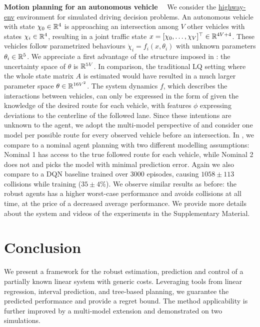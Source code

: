 \documentclass{article}
\begin{document}
\textbf{Motion planning for an autonomous vehicle}~~
We consider the \href{https://github.com/eleurent/highway-env}{highway-env} environment \citep{highway-env} for simulated driving decision problems. An autonomous vehicle with state $\chi_0\in\mathbb{R}^4$ is approaching an intersection among $V$ other vehicles with states $\chi_i\in\mathbb{R}^4$, resulting in a joint traffic state $x = [\chi_0, \dots,\chi_V]^\top\in\mathbb{R}^{4V+4}$. These vehicles follow parametrized behaviours $\dot{\chi}_i=f_i(x,\theta_i)$ with unknown parameters $\theta_i\in\mathbb{R}^5$. We appreciate a first advantage of the structure imposed in : the uncertainty space of $\theta$ is $\mathbb{R}^{5V}$. In comparison, the traditional LQ setting where the whole state matrix $A$ is estimated would have resulted in a much larger parameter space $\theta\in\mathbb{R}^{16V^2}$.
The system dynamics $f$, which describes the interactions between vehicles, can only be expressed in the form of  given the knowledge of the desired route for each vehicle, with features $\phi$ expressing deviations to the centerline of the followed lane. Since these intentions are unknown to the agent, we adopt the multi-model perspective of  and consider one model per possible route for every observed vehicle before an intersection. In , we compare  to a nominal agent planning with two different modelling assumptions: Nominal 1 has access to the true followed route for each vehicle, while Nominal 2 does not and picks the model with minimal prediction error. Again we also compare to a DQN baseline trained over 3000 episodes, causing $1058\pm113$ collisions while training ($35\pm4\%$). We observe similar results as before: the robust agents has a higher worst-case performance and avoids collisions at all time, at the price of a decreased average performance. We provide more details about the system and videos of the experiments in the Supplementary Material.

\section*{Conclusion}

We present a framework for the robust estimation, prediction and control of a partially known linear system with generic costs. Leveraging tools from linear regression, interval prediction, and tree-based planning, we guarantee the predicted performance and provide a regret bound. The method applicability is further improved by a multi-model extension and demonstrated on two simulations.
\end{document}
